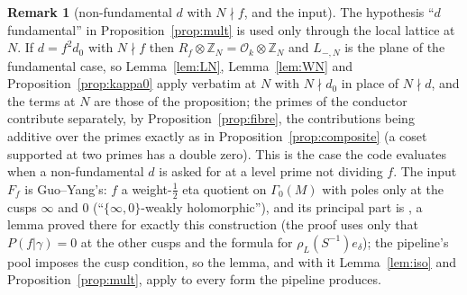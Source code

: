 \documentclass[11pt,reqno]{amsart}
\theoremstyle{plain}
\theoremstyle{definition}
\newtheorem{remark}[theorem]{Remark}
\newcommand{\Z}{\mathbb{Z}}
\begin{document}
\begin{remark}[non-fundamental $d$ with $N\nmid f$, and the input]\label{rem:multext}
The hypothesis ``$d$ fundamental'' in Proposition~\ref{prop:mult} is used only through the local
lattice at $N$. If $d=f^2d_0$ with $N\nmid f$ then $R_f\otimes\Z_N=\mathcal O_k\otimes\Z_N$ and
$L_{-,N}$ is the plane of the fundamental case, so Lemma~\ref{lem:LN}, Lemma~\ref{lem:WN} and
Proposition~\ref{prop:kappa0} apply verbatim at $N$ with $N\nmid d_0$ in place of $N\nmid d$, and the
terms at $N$ are those of the proposition; the primes of the conductor contribute separately, by
Proposition~\ref{prop:fibre}, the contributions being additive over the primes exactly as in
Proposition~\ref{prop:composite} (a coset supported at two primes has a double zero). This is the
case the code evaluates when a non-fundamental $d$ is asked for at a level prime not dividing $f$.
The input $F_f$ is Guo--Yang's: $f$ a weight-$\tfrac12$ eta quotient on $\Gamma_0(M)$ with poles only
at the cusps $\infty$ and $0$ (``$\{\infty,0\}$-weakly holomorphic''), and its principal part is
\cite[Lemma~24]{GY}, a lemma proved there for exactly this construction (the proof uses only that
$P(f|\gamma)=0$ at the other cusps and the formula for $\rho_L(S^{-1})e_\delta$); the pipeline's
pool imposes the cusp condition, so the lemma, and with it Lemma~\ref{lem:iso} and
Proposition~\ref{prop:mult}, apply to every form the pipeline produces.
\end{remark}
\end{document}
